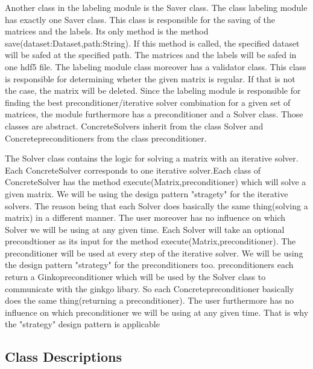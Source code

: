 \documentclass[parskip=full]{scrartcl}
\begin{document}
Another class in the labeling module is the Saver class. The class labeling module has exactly one Saver class. This class is responsible for the saving of the matrices and the labels. Its only method is the method save(dataset:Dataset,path:String). If this method is called, the specified dataset will be safed at the specified path. The matrices and the labels will be safed in one hdf5 file.\newline
\newline
The labeling module class moreover has a validator class. This class is responsible for determining wheter the given matrix is regular. If that is not the case, the matrix will be deleted.
\newline\newline
Since the labeling module is responsible for finding the best \gls{preconditioner}/\gls{iterative solver} combination for a given set of matrices, the module furthermore has a \gls{preconditioner} and a Solver class. Those classes are abstract. ConcreteSolvers inherit from the class Solver and Concrete\gls{preconditioner}s from the class \gls{preconditioner}.\newline\newline

The Solver class contains the logic for solving a matrix with an \gls{iterative solver}. Each ConcreteSolver corresponds to one \gls{iterative solver}.Each class of ConcreteSolver has the method execute(Matrix,\gls{preconditioner}) which will solve a given matrix. We will be using the design pattern "stragety" for the \gls{iterative solver}s. The reason being that each Solver does basically the same thing(solving a matrix) in a different manner. The user moreover has no influence on which Solver we will be using at any given time.
Each Solver will take an optional precondtioner as its input for the method execute(Matrix,\gls{preconditioner}). The \gls{preconditioner} will be used at every step of the \gls{iterative solver}. We will be using the design pattern "\gls{strategy}" for the \gls{preconditioner}s too. \gls{preconditioner}s each return a Ginko\gls{preconditioner} which will be used by the Solver class to communicate with the ginkgo libary. So each Concrete\gls{preconditioner} basically does the same thing(returning a \gls{preconditioner}). The user furthermore has no influence on which \gls{preconditioner} we will be using at any given time. That is why the "\gls{strategy}" design pattern is applicable

\subsection{Class Descriptions}
\end{document}
